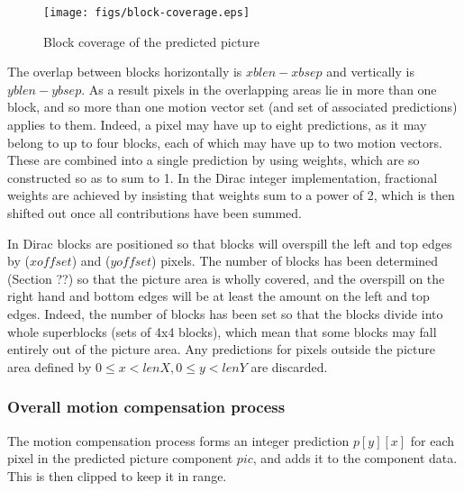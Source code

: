 \begin{figure}[!ht]
\centering
\texttt{[image: figs/block-coverage.eps]}
\caption{Block coverage of the predicted picture}
\label{fig:blockcoverage}
\end{figure}

\begin{informative*}
The overlap between blocks horizontally is $xblen - xbsep$ and vertically is
$yblen - ybsep$. As a result pixels in the overlapping areas lie in more than
one block, and so more than one motion vector set (and set of associated predictions)
applies to them. Indeed, a pixel may have up to eight predictions, as it may belong to
up to four blocks, each of which may have up to two motion vectors. These are combined
into a single prediction by using weights, which are so constructed so as to sum to 1. In the
 Dirac integer implementation, fractional weights are achieved by insisting that weights sum 
to a power of 2, which is then shifted out once all contributions have been summed.

In Dirac blocks are positioned so that blocks will overspill the left and top edges by 
($xoffset$) and ($yoffset$) pixels.  The number of blocks has been
determined (Section ??) so that the picture area is wholly covered, and the overspill
 on the right hand and bottom edges will be at least the amount on the left and top edges. 
Indeed, the number of blocks has been set so that the blocks divide into whole superblocks
(sets of 4x4 blocks), which mean that some blocks may fall entirely out of the picture area. 
 Any predictions for pixels outside the picture area defined by $0 \leq x < lenX, 0 \leq y <lenY$
are discarded.

\end{informative*}

\subsubsection{Overall motion compensation process}
\label{mcprocess}

The motion compensation process forms an integer prediction $p[y][x]$ for each pixel in the predicted
picture component $pic$, and adds it to the component data. This is then clipped to keep it in range.

\begin{pseudo*}
\bsELSE
\bsEND
{}
    \bsEND
\bsEND
\end{pseudo*}

